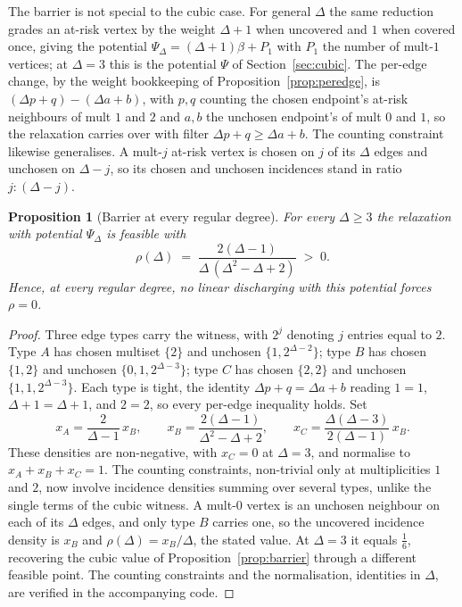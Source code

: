 \documentclass[11pt]{article}
\newtheorem{proposition}{Proposition}
\theoremstyle{definition}
\theoremstyle{remark}
\newcommand{\Pot}{\Psi}
\begin{document}
The barrier is not special to the cubic case. For general $\Delta$ the same
reduction grades an at-risk vertex by the weight $\Delta + 1$ when uncovered and
$1$ when covered once, giving the potential $\Pot_\Delta = (\Delta + 1)\beta +
P_1$ with $P_1$ the number of mult-$1$ vertices; at $\Delta = 3$ this is the
potential $\Pot$ of Section~\ref{sec:cubic}. The per-edge change, by the weight
bookkeeping of Proposition~\ref{prop:peredge}, is $(\Delta p + q) - (\Delta a +
b)$, with $p, q$ counting the chosen endpoint's at-risk neighbours of mult $1$
and $2$ and $a, b$ the unchosen endpoint's of mult $0$ and $1$, so the relaxation
carries over with filter $\Delta p + q \ge \Delta a + b$.
The counting constraint likewise generalises. A mult-$j$ at-risk vertex is chosen
on $j$ of its $\Delta$ edges and unchosen on $\Delta - j$, so its chosen and
unchosen incidences stand in ratio $j : (\Delta - j)$.

\begin{proposition}[Barrier at every regular degree]\label{prop:barrier-delta}
For every $\Delta \ge 3$ the relaxation with potential $\Pot_\Delta$ is feasible
with
\[
  \rho(\Delta) \;=\; \frac{2(\Delta - 1)}{\Delta\,(\Delta^{2} - \Delta + 2)}
  \;>\; 0 .
\]
Hence, at every regular degree, no linear discharging with this potential forces
$\rho = 0$.
\end{proposition}

\begin{proof}
Three edge types carry the witness, with $2^{j}$ denoting $j$ entries equal to
$2$. Type $A$ has chosen multiset $\{2\}$ and unchosen $\{1, 2^{\Delta - 2}\}$;
type $B$ has chosen $\{1, 2\}$ and unchosen $\{0, 1, 2^{\Delta - 3}\}$; type $C$
has chosen $\{2, 2\}$ and unchosen $\{1, 1, 2^{\Delta - 3}\}$. Each type is tight,
the identity $\Delta p + q = \Delta a + b$ reading $1 = 1$, $\Delta + 1 = \Delta +
1$, and $2 = 2$, so every per-edge inequality holds. Set
\[
  x_A = \frac{2}{\Delta - 1}\,x_B, \qquad
  x_B = \frac{2(\Delta - 1)}{\Delta^{2} - \Delta + 2}, \qquad
  x_C = \frac{\Delta(\Delta - 3)}{2(\Delta - 1)}\,x_B.
\]
These densities are non-negative, with $x_C = 0$ at $\Delta = 3$, and normalise
to $x_A + x_B + x_C = 1$. The counting constraints, non-trivial only at
multiplicities $1$ and $2$, now involve incidence densities summing over several
types, unlike the single terms of the cubic witness. A mult-$0$ vertex is an unchosen neighbour
on each of its $\Delta$ edges, and only type $B$ carries one, so the uncovered
incidence density is $x_B$ and $\rho(\Delta) = x_B / \Delta$, the stated value.
At $\Delta = 3$ it equals $\tfrac16$, recovering the cubic value of
Proposition~\ref{prop:barrier} through a different feasible point. The counting
constraints and the normalisation, identities in $\Delta$, are verified in the
accompanying code.
\end{proof}
\end{document}
